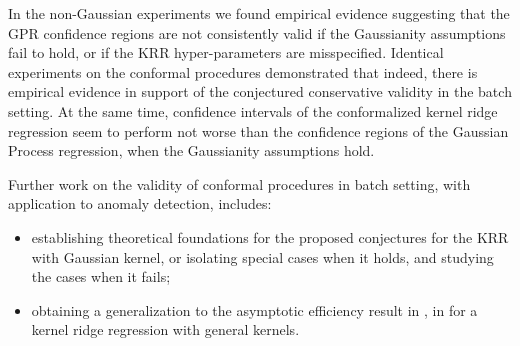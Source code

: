 \documentclass[a4paper,14pt]{extarticle}
\begin{document}
In the non-Gaussian experiments we found empirical evidence suggesting that the GPR
confidence regions are not consistently valid if the Gaussianity assumptions fail
to hold, or if the KRR hyper-parameters are misspecified. Identical experiments on
the conformal procedures demonstrated that indeed, there is empirical evidence in
support of the conjectured conservative validity in the batch setting. At the same
time, confidence intervals of the conformalized kernel ridge regression seem to
perform not worse than the confidence regions of the Gaussian Process regression,
when the Gaussianity assumptions hold.

Further work on the validity of conformal procedures in batch setting, with application
to anomaly detection, includes: \begin{itemize}
  \item establishing theoretical foundations for the proposed conjectures for the
  KRR with Gaussian kernel, or isolating special cases when it holds, and studying
  the cases when it fails;
  \item obtaining a generalization to the asymptotic efficiency result in \cite{burnaevV14},
  in for a kernel ridge regression with general kernels.
\end{itemize}


% 


\end{document}
